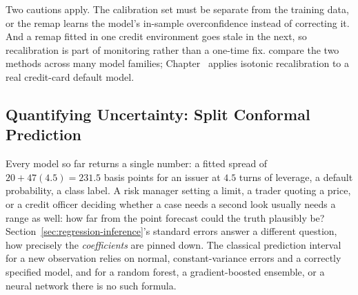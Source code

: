 \documentclass[../ai_in_finance]{subfiles}
\begin{document}
Two cautions apply. The calibration set must be separate from the training data, or the remap learns the model's in-sample overconfidence instead of correcting it. And a remap fitted in one credit environment goes stale in the next, so recalibration is part of monitoring rather than a one-time fix. \textcite{niculescumizil2005predicting} compare the two methods across many model families; Chapter~ applies isotonic recalibration to a real credit-card default model.

\subsection{Quantifying Uncertainty: Split Conformal Prediction}
\label{sec:ml-conformal}

Every model so far returns a single number: a fitted spread of $20 + 47(4.5) = 231.5$ basis points for an issuer at $4.5$ turns of leverage, a default probability, a class label. A risk manager setting a limit, a trader quoting a price, or a credit officer deciding whether a case needs a second look usually needs a range as well: how far from the point forecast could the truth plausibly be? Section~\ref{sec:regression-inference}'s standard errors answer a different question, how precisely the \emph{coefficients} are pinned down. The classical prediction interval for a new observation relies on normal, constant-variance errors and a correctly specified model, and for a random forest, a gradient-boosted ensemble, or a neural network there is no such formula.
\end{document}
